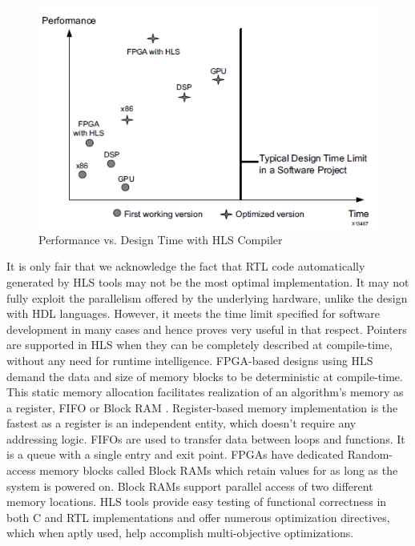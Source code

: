 \begin{figure}[h!]
  \centering
  \includegraphics[width=0.8\linewidth]{figures/graph-hlsdesign.png}
  \caption{Performance vs. Design Time with HLS Compiler
  \cite{xil_hls}}
  \label{fig:graph-hlsdesign}
\end{figure}
It is only fair that we acknowledge the fact that RTL code automatically generated by HLS tools may not be the most optimal implementation. It may not fully exploit the parallelism offered by the underlying hardware, unlike the design with HDL languages. However, it meets the time limit specified for software development in many cases and hence proves very useful in that respect.\newline \newline 
Pointers are supported in HLS when they can be completely described at compile-time, without any need for runtime intelligence. FPGA-based designs using HLS demand the data and size of memory blocks to be deterministic at compile-time. This static memory allocation facilitates realization of an algorithm’s memory as a register, FIFO or Block RAM \cite{xil_hls}. \newline \newline
Register-based memory implementation is the fastest as a register is an independent entity, which doesn’t require any addressing logic. FIFOs are used to transfer data between loops and functions. It is a queue with a single entry and exit point. FPGAs have dedicated Random-access memory blocks called Block RAMs which retain values for as long as the system is powered on. Block RAMs support parallel access of two different memory locations. \newline \newline
HLS tools provide easy testing of functional correctness in both C and RTL implementations and offer numerous optimization directives, which when aptly used, help accomplish multi-objective optimizations.

